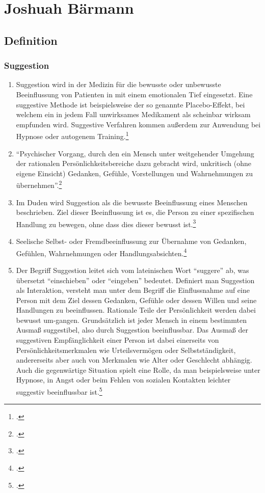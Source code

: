 \chapter{Joshuah Bärmann}
\label{sec:Joshuah_Baermann}

\section{Definition}

\subsection{Suggestion}
\begin{enumerate}
	\item Suggestion wird in der Medizin für die bewusste oder unbewusste Beeinflussung von Patienten
in mit einem emotionalen Tief eingesetzt. Eine suggestive Methode ist beispielsweise der so genannte
Placebo-Effekt, bei welchem ein in jedem Fall unwirksames Medikament als scheinbar wirksam empfunden
wird. Suggestive Verfahren kommen außerdem zur Anwendung bei Hypnose oder autogenem
Training.\footcite[145]{Frank_Neurologie_und_Psychiatrie}

	\item \enquote{Psychischer Vorgang, durch den ein Mensch unter weitgehender Umgehung der rationalen
Persönlichkeitsbereiche dazu gebracht wird, unkritisch (ohne eigene Einsicht) Gedanken, Gefühle,
Vorstellungen und Wahrnehmungen zu übernehmen}.\footcite[514]{Peters_Woerterbuch_der_Psychiatrie}

	\item Im Duden wird Suggestion als die bewusste Beeinflussung eines Menschen beschrieben. Ziel
dieser Beeinflussung ist es, die Person zu einer spezifischen Handlung zu bewegen, ohne dass dies
dieser bewusst ist.\footcite[782]{Duden:Fremdwoerterbuch}

	\item Seelische Selbst- oder Fremdbeeinflussung zur Übernahme von Gedanken, Gefühlen,
Wahrnehmungen oder
Handlungsabsichten.\footcite[217]{Enzyklopaedie_elektrophysiologischer_Untersuchungen}

	\item Der Begriff Suggestion leitet sich vom lateinischen Wort \enquote{suggere} ab, was übersetzt
\enquote{einschieben} oder \enquote{eingeben} bedeutet. Definiert man Suggestion als Interaktion, versteht man unter
dem Begriff die Einflussnahme auf eine Person mit dem Ziel dessen Gedanken, Gefühle oder dessen
Willen und seine Handlungen zu beeinflussen. Rationale Teile der Persönlichkeit werden dabei bewusst
um-gangen. Grundsätzlich ist jeder Mensch in einem bestimmten Ausmaß suggestibel, also durch
Suggestion beeinflussbar. Das Ausmaß der suggestiven Empfänglichkeit einer Person ist dabei
einerseits von Persönlichkeitsmerkmalen wie Urteilsvermögen oder Selbstständigkeit, andererseits aber
auch von Merkmalen wie Alter oder Geschlecht abhängig. Auch die gegenwärtige Situation spielt eine
Rolle, da man beispielsweise unter Hypnose, in Angst oder beim Fehlen von sozialen Kontakten leichter
suggestiv beeinflussbar ist.\footcite[848]{Psychologisches_Woerterbuch}
\end{enumerate}

